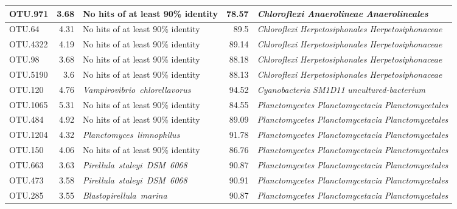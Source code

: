\begin{longtable}{lrP{5cm}rP{7cm}}
OTU.971 & 3.68 & {No hits of at least 90\% identity} & 78.57 & \mbox{\textit{Chloroflexi}} \mbox{\textit{Anaerolineae}} \mbox{\textit{Anaerolineales}} \\ \midrule
OTU.64 & 4.31 & {No hits of at least 90\% identity} & 89.5 & \mbox{\textit{Chloroflexi}} \mbox{\textit{Herpetosiphonales}} \mbox{\textit{Herpetosiphonaceae}} \\ \midrule
OTU.4322 & 4.19 & {No hits of at least 90\% identity} & 89.14 & \mbox{\textit{Chloroflexi}} \mbox{\textit{Herpetosiphonales}} \mbox{\textit{Herpetosiphonaceae}} \\ \midrule
OTU.98 & 3.68 & {No hits of at least 90\% identity} & 88.18 & \mbox{\textit{Chloroflexi}} \mbox{\textit{Herpetosiphonales}} \mbox{\textit{Herpetosiphonaceae}} \\ \midrule
OTU.5190 & 3.6 & {No hits of at least 90\% identity} & 88.13 & \mbox{\textit{Chloroflexi}} \mbox{\textit{Herpetosiphonales}} \mbox{\textit{Herpetosiphonaceae}} \\ \midrule
OTU.120 & 4.76 & \mbox{\textit{Vampirovibrio chlorellavorus}} & 94.52 & \mbox{\textit{Cyanobacteria}} \mbox{\textit{SM1D11}} \mbox{\textit{uncultured-bacterium}} \\ \midrule
OTU.1065 & 5.31 & {No hits of at least 90\% identity} & 84.55 & \mbox{\textit{Planctomycetes}} \mbox{\textit{Planctomycetacia}} \mbox{\textit{Planctomycetales}} \\ \midrule
OTU.484 & 4.92 & {No hits of at least 90\% identity} & 89.09 & \mbox{\textit{Planctomycetes}} \mbox{\textit{Planctomycetacia}} \mbox{\textit{Planctomycetales}} \\ \midrule
OTU.1204 & 4.32 & \mbox{\textit{Planctomyces limnophilus}} & 91.78 & \mbox{\textit{Planctomycetes}} \mbox{\textit{Planctomycetacia}} \mbox{\textit{Planctomycetales}} \\ \midrule
OTU.150 & 4.06 & {No hits of at least 90\% identity} & 86.76 & \mbox{\textit{Planctomycetes}} \mbox{\textit{Planctomycetacia}} \mbox{\textit{Planctomycetales}} \\ \midrule
OTU.663 & 3.63 & \mbox{\textit{Pirellula staleyi DSM 6068}} & 90.87 & \mbox{\textit{Planctomycetes}} \mbox{\textit{Planctomycetacia}} \mbox{\textit{Planctomycetales}} \\ \midrule
OTU.473 & 3.58 & \mbox{\textit{Pirellula staleyi DSM 6068}} & 90.91 & \mbox{\textit{Planctomycetes}} \mbox{\textit{Planctomycetacia}} \mbox{\textit{Planctomycetales}} \\ \midrule
OTU.285 & 3.55 & \mbox{\textit{Blastopirellula marina}} & 90.87 & \mbox{\textit{Planctomycetes}} \mbox{\textit{Planctomycetacia}} \mbox{\textit{Planctomycetales}} \\ \midrule

\end{longtable}

